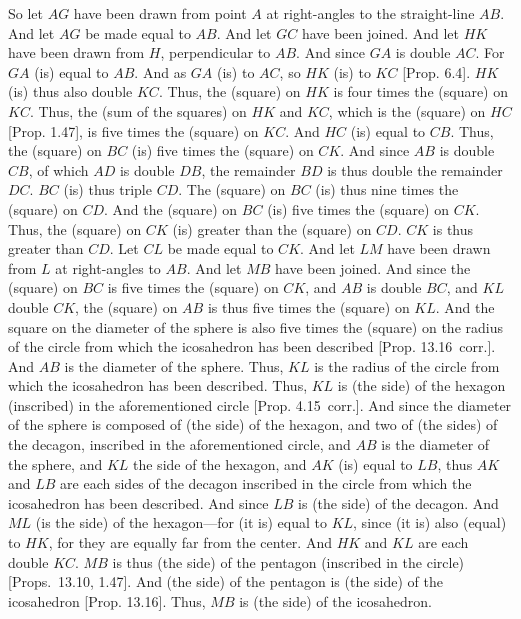 \begin{Parallel}{}{}
{So let $AG$ have been drawn from point $A$ at right-angles to the straight-line
$AB$. And let $AG$ be made equal to $AB$. And let $GC$
have been joined. And let $HK$ have been drawn from $H$, perpendicular to $AB$. And since $GA$ is double $AC$. 
For $GA$ (is) equal to $AB$.  And as $GA$ (is) to $AC$, so
$HK$ (is) to $KC$ [Prop. 6.4]. $HK$ (is) thus also double
$KC$. Thus, the (square) on $HK$ is four times the (square)
on $KC$. Thus, the (sum of the squares) on $HK$ and $KC$,
which is the (square) on $HC$ [Prop. 1.47],  is five times the
(square) on $KC$.  And $HC$ (is) equal to $CB$. Thus,
the (square) on $BC$ (is) five times the (square) on  $CK$. 
And since $AB$ is double $CB$, of which $AD$ is double $DB$, 
the remainder $BD$ is thus double the remainder $DC$.
$BC$ (is) thus triple $CD$. The (square) on $BC$ (is) thus nine times 
the (square) on $CD$.  And the (square) on $BC$ (is) five times the (square)
on $CK$.  Thus, the (square) on $CK$ (is) greater than the (square) on $CD$.
$CK$ is thus greater than $CD$. Let $CL$ be made equal to $CK$.
And let $LM$ have been drawn from $L$ at right-angles to $AB$. 
And let $MB$ have been joined. And since the (square) on  $BC$
is five times the (square) on $CK$, and $AB$ is double $BC$, and $KL$
double $CK$, the (square) on $AB$ is thus five times the (square)
on $KL$. And the square on the diameter of the sphere  is also five times
the (square) on the radius of the circle from which the icosahedron has been
described [Prop. 13.16~corr.]. And $AB$ is the diameter of the sphere.
Thus, $KL$ is the radius of the circle from which the icosahedron has
been described. Thus, $KL$ is (the side) of the hexagon (inscribed) in the aforementioned
circle [Prop. 4.15~corr.]. And since the diameter of the sphere is composed of (the side) of the hexagon, and two of (the sides) of the decagon, inscribed
in the aforementioned circle, and $AB$ is the diameter of the sphere, 
and $KL$ the side of the hexagon, and $AK$ (is) equal to $LB$, thus
$AK$ and $LB$ are each sides of the decagon inscribed in the  circle
from which the icosahedron has been described. And since
$LB$ is (the side) of the decagon. And $ML$ (is the side) of the hexagon---for (it is) equal to $KL$, since (it is) also (equal) to $HK$, for they are equally
far from the center. And $HK$ and $KL$ are each double $KC$. 
$MB$ is thus (the side) of the pentagon (inscribed in the circle) [Props.~13.10, 1.47]. 
And (the side) of the pentagon is (the side) of the icosahedron [Prop. 13.16]. 
Thus, $MB$ is (the side) of the icosahedron. 

}
\end{Parallel}
